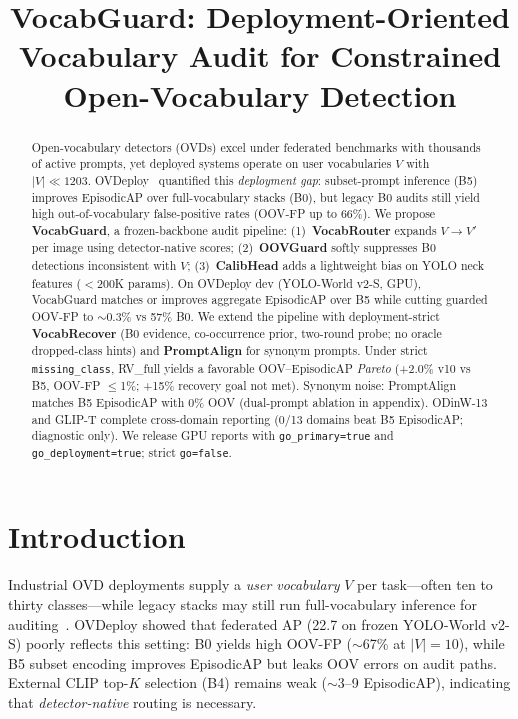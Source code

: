 \documentclass[10pt,twocolumn,letterpaper]{article}
\title{VocabGuard: Deployment-Oriented Vocabulary Audit for Constrained Open-Vocabulary Detection}
\begin{document}
\maketitle

\begin{abstract}
Open-vocabulary detectors (OVDs) excel under federated benchmarks with thousands of active prompts, yet deployed systems operate on user vocabularies $V$ with $|V| \ll 1203$.
OVDeploy~\cite{ovdeploy2026} quantified this \emph{deployment gap}: subset-prompt inference (B5) improves EpisodicAP over full-vocabulary stacks (B0), but legacy B0 audits still yield high out-of-vocabulary false-positive rates (OOV-FP up to 66\%).
We propose \textbf{VocabGuard}, a frozen-backbone audit pipeline: (1)~\textbf{VocabRouter} expands $V \to V'$ per image using detector-native scores; (2)~\textbf{OOVGuard} softly suppresses B0 detections inconsistent with $V$; (3)~\textbf{CalibHead} adds a lightweight bias on YOLO neck features ($<$200K params).
On OVDeploy dev (YOLO-World v2-S, GPU), VocabGuard matches or improves aggregate EpisodicAP over B5 while cutting guarded OOV-FP to ${\sim}$0.3\% vs 57\% B0.
We extend the pipeline with deployment-strict \textbf{VocabRecover} (B0 evidence, co-occurrence prior, two-round probe; no oracle dropped-class hints) and \textbf{PromptAlign} for synonym prompts.
Under strict \texttt{missing\_class}, RV\_full yields a favorable OOV--EpisodicAP \emph{Pareto} (+2.0\% v10 vs B5, OOV-FP $\le$1\%; +15\% recovery goal not met).
Synonym noise: PromptAlign matches B5 EpisodicAP with 0\% OOV (dual-prompt ablation in appendix).
ODinW-13 and GLIP-T complete cross-domain reporting (0/13 domains beat B5 EpisodicAP; diagnostic only).
We release GPU reports with \texttt{go\_primary=true} and \texttt{go\_deployment=true}; strict \texttt{go=false}.
\end{abstract}

\section{Introduction}
\label{sec:intro}

Industrial OVD deployments supply a \emph{user vocabulary} $V$ per task---often ten to thirty classes---while legacy stacks may still run full-vocabulary inference for auditing~\cite{ovdeploy2026,cheng2024yoloworld,li2022glip}.
OVDeploy showed that federated AP (22.7 on frozen YOLO-World v2-S) poorly reflects this setting: B0 yields high OOV-FP (${\sim}$67\% at $|V|{=}10$), while B5 subset encoding improves EpisodicAP but leaks OOV errors on audit paths.
External CLIP top-$K$ selection (B4) remains weak ($\sim$3--9 EpisodicAP), indicating that \emph{detector-native} routing is necessary.
\end{document}
